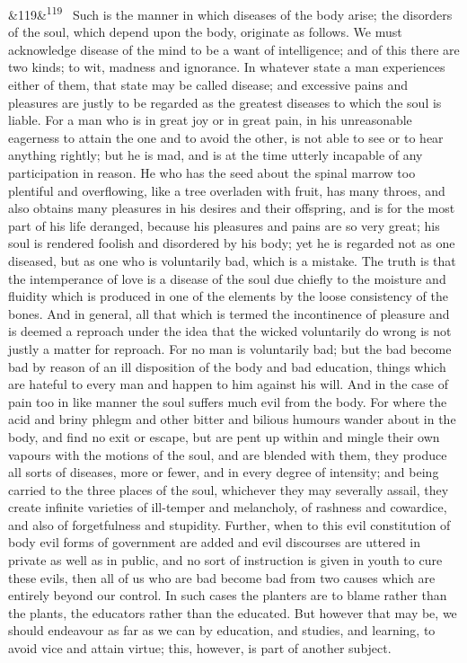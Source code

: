 \documentclass[12pt]{article}
\newcommand{\para}[1][]{\par\noindent\ifx&#1&\else\textsuperscript{\footnotesize #1}~\fi}
\begin{document}
\para[119] Such is the manner in which diseases of the body arise; the disorders of the soul, which depend upon the body, originate as follows. We must acknowledge disease of the mind to be a want of intelligence; and of this there are two kinds; to wit, madness and ignorance. In whatever state a man experiences either of them, that state may be called disease; and excessive pains and pleasures are justly to be regarded as the greatest diseases to which the soul is liable. For a man who is in great joy or in great pain, in his unreasonable eagerness to attain the one and to avoid the other, is not able to see or to hear anything rightly; but he is mad, and is at the time utterly incapable of any participation in reason. He who has the seed about the spinal marrow too plentiful and overflowing, like a tree overladen with fruit, has many throes, and also obtains many pleasures in his desires and their offspring, and is for the most part of his life deranged, because his pleasures and pains are so very great; his soul is rendered foolish and disordered by his body; yet he is regarded not as one diseased, but as one who is voluntarily bad, which is a mistake. The truth is that the intemperance of love is a disease of the soul due chiefly to the moisture and fluidity which is produced in one of the elements by the loose consistency of the bones. And in general, all that which is termed the incontinence of pleasure and is deemed a reproach under the idea that the wicked voluntarily do wrong is not justly a matter for reproach. For no man is voluntarily bad; but the bad become bad by reason of an ill disposition of the body and bad education, things which are hateful to every man and happen to him against his will. And in the case of pain too in like manner the soul suffers much evil from the body. For where the acid and briny phlegm and other bitter and bilious humours wander about in the body, and find no exit or escape, but are pent up within and mingle their own vapours with the motions of the soul, and are blended with them, they produce all sorts of diseases, more or fewer, and in every degree of intensity; and being carried to the three places of the soul, whichever they may severally assail, they create infinite varieties of ill-temper and melancholy, of rashness and cowardice, and also of forgetfulness and stupidity. Further, when to this evil constitution of body evil forms of government are added and evil discourses are uttered in private as well as in public, and no sort of instruction is given in youth to cure these evils, then all of us who are bad become bad from two causes which are entirely beyond our control. In such cases the planters are to blame rather than the plants, the educators rather than the educated. But however that may be, we should endeavour as far as we can by education, and studies, and learning, to avoid vice and attain virtue; this, however, is part of another subject.
\end{document}
